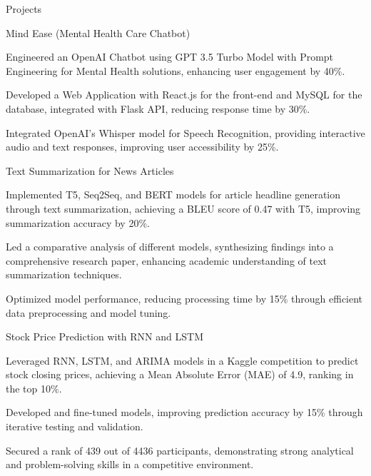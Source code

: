 \documentclass{resume} %
\begin{document}
    \begin{rSection}{Projects}
                    \begin{rSubsection}
                                    {Mind Ease (Mental Health Care Chatbot)}
                                {}{}{}
                                    \item Engineered an OpenAI Chatbot using GPT 3.5 Turbo Model with Prompt Engineering for Mental Health solutions, enhancing user engagement by 40\%.
                                    \item Developed a Web Application with React.js for the front{-}end and MySQL for the database, integrated with Flask API, reducing response time by 30\%.
                                    \item Integrated OpenAI's Whisper model for Speech Recognition, providing interactive audio and text responses, improving user accessibility by 25\%.
                            \end{rSubsection}
                    \begin{rSubsection}
                                    {Text Summarization for News Articles}
                                {}{}{}
                                    \item Implemented T5, Seq2Seq, and BERT models for article headline generation through text summarization, achieving a BLEU score of 0.47 with T5, improving summarization accuracy by 20\%.
                                    \item Led a comparative analysis of different models, synthesizing findings into a comprehensive research paper, enhancing academic understanding of text summarization techniques.
                                    \item Optimized model performance, reducing processing time by 15\% through efficient data preprocessing and model tuning.
                            \end{rSubsection}
                    \begin{rSubsection}
                                    {Stock Price Prediction with RNN and LSTM}
                                {}{}{}
                                    \item Leveraged RNN, LSTM, and ARIMA models in a Kaggle competition to predict stock closing prices, achieving a Mean Absolute Error (MAE) of 4.9, ranking in the top 10\%.
                                    \item Developed and fine{-}tuned models, improving prediction accuracy by 15\% through iterative testing and validation.
                                    \item Secured a rank of 439 out of 4436 participants, demonstrating strong analytical and problem{-}solving skills in a competitive environment.
                            \end{rSubsection}
            \end{rSection}
\end{document}
